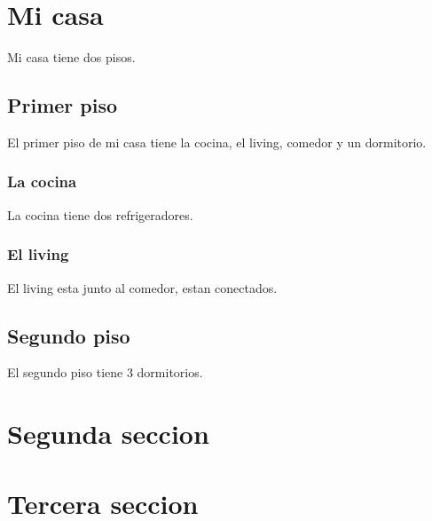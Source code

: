 \section{Mi casa}
Mi casa tiene dos pisos.

\subsection{Primer piso}
El primer piso de mi casa tiene la cocina, el living, comedor y un dormitorio.
\subsubsection{La cocina}
La cocina tiene dos refrigeradores.
\subsubsection{El living}
El living esta junto al comedor, estan conectados.

\subsection{Segundo piso}
El segundo piso tiene 3 dormitorios.

\section{Segunda seccion}

\section{Tercera seccion}
